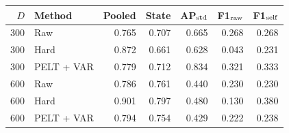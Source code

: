 \begin{tabular}{rlrrrrr}
\toprule
$D$ & Method & Pooled & State & AP$_{\rm std}$ & F1$_{\rm raw}$ & F1$_{\rm self}$ \\
\midrule
300 & Raw & 0.765 & 0.707 & 0.665 & 0.268 & 0.268 \\
300 & Hard & 0.872 & 0.661 & 0.628 & 0.043 & 0.231 \\
300 & PELT + VAR & 0.779 & 0.712 & 0.834 & 0.321 & 0.333 \\
600 & Raw & 0.786 & 0.761 & 0.440 & 0.230 & 0.230 \\
600 & Hard & 0.901 & 0.797 & 0.480 & 0.130 & 0.380 \\
600 & PELT + VAR & 0.794 & 0.754 & 0.429 & 0.222 & 0.238 \\
\bottomrule
\end{tabular}
